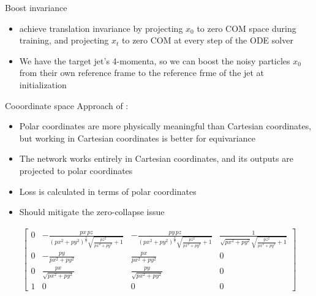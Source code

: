 \documentclass[handout, aspectratio=169,xcolor=dvipsnames]{beamer}
\begin{document}
\begin{frame}{Boost invariance}
    \begin{itemize}
        \item \cite{songEquivariantFlowMatching2023} achieve translation invariance by projecting $x_0$ to zero COM space during training, and projecting $x_t$ to zero COM at every step of the ODE solver
        \item We have the target jet's 4-momenta, so we can boost the noisy particles $x_0$ from their own reference frame to the reference frme of the jet at initialization
    \end{itemize}
\end{frame}

\begin{frame}{Cooordinate space}
    Approach of \cite{spinnerLorentzEquivariantGeometricAlgebra2024}:
    \begin{itemize}
        \item Polar coordinates are more physically meaningful than Cartesian coordinates, but working in Cartesian coordinates is better for equivariance
        \item The network works entirely in Cartesian coordinates, and its outputs are projected to polar coordinates
        \item Loss is calculated in terms of polar coordinates
        \item Should mitigate the zero-collapse issue
    \end{itemize}
\end{frame}

\begin{frame}
    \begin{align*}
        \left[
        \begin{matrix}
            0 & -\frac{px\, pz}{\left(px^{2} + py^{2}\right)^{\frac{3}{2}} \sqrt{\frac{pz^{2}}{px^{2} + py^{2}} + 1}} & -\frac{py\, pz}{\left(px^{2} + py^{2}\right)^{\frac{3}{2}} \sqrt{\frac{pz^{2}}{px^{2} + py^{2}} + 1}} & \frac{1}{\sqrt{px^{2} + py^{2}} \sqrt{\frac{pz^{2}}{px^{2} + py^{2}} + 1}} \\
            0 & -\frac{py}{px^{2} + py^{2}} & \frac{px}{px^{2} + py^{2}} & 0 \\
            0 & \frac{px}{\sqrt{px^{2} + py^{2}}} & \frac{py}{\sqrt{px^{2} + py^{2}}} & 0 \\
            1 & 0 & 0 & 0
        \end{matrix}
        \right]
    \end{align*}
\end{frame}
\end{document}
